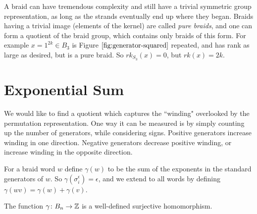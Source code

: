 \documentclass[12pt]{thesis}
\begin{document}
A braid can have tremendous complexity and still have a
trivial symmetric group representation, as long as the strands
eventually end up where they began.
Braids having a trivial image (elements of the kernel) are called \textit{pure braids},
and one can form a quotient of the braid group,
which contains only braids of this form.
For example $x = 1^{2k} \in B_{3}$ is Figure $\ref{fig:generator-squared}$ repeated,
and has rank as large as desired, but is a pure braid.
So $rk_{S_{3}}(x) = 0$, but $rk(x) = 2k$. 

\section{Exponential Sum}

We would like to find a quotient which captures
the ``winding" overlooked by the permutation representation.
One way it can be measured is by simply counting up the number of generators,
while considering signs.
Positive generators increase winding in one direction.
Negative generators decrease positive winding, or increase winding in the opposite direction.

    For a braid word $w$ define $\gamma(w)$ 
    to be the sum of the exponents in the standard generators of $w$.
    So $\gamma(\sigma_{i}^{\epsilon}) = \epsilon$,
    and we extend to all words by defining $\gamma(wv) = \gamma(w) + \gamma(v)$.

\begin{proposition}
    The function $\gamma \colon B_{n} \rightarrow \mathbb{Z}$ is a well-defined surjective homomorphism.
\end{proposition}
\end{document}
